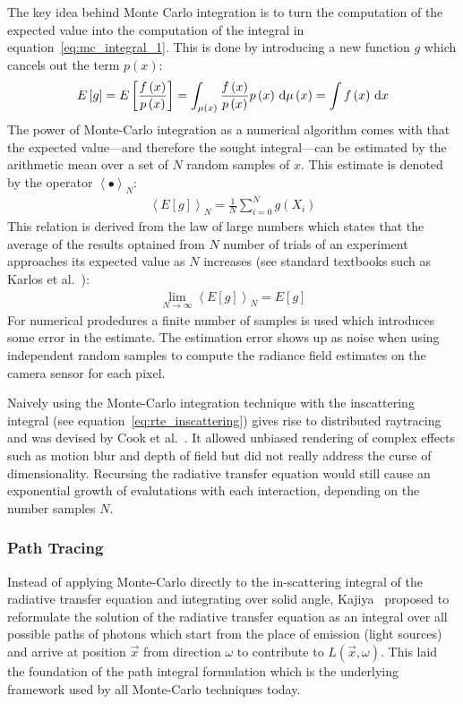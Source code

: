 The key idea behind Monte Carlo integration is to turn the computation of the expected value into the computation of the integral in equation~\ref{eq:mc_integral_1}. This is done by introducing a new function $g$ which cancels out the term $p\left(x\right)$:
\begin{align}
E\left[g\right]
=E\left[\frac{f\left(x\right)}{p\left(x\right)}\right]
= \int_{\mu\left(x\right)} \frac{f\left(x\right)}{p\left(x\right)}p\left(x\right)\,\mathrm{d}\mu\left(x\right)
=\int f\left(x\right)\,\mathrm{d} x
\end{align}
The power of Monte-Carlo integration as a numerical algorithm comes with that the expected value---and therefore the sought integral---can be estimated by the arithmetic mean over a set of $N$ random samples of $x$. This estimate is denoted by the operator $\left<\bullet\right>_N$:
\begin{align}
\left<E[g]\right>_N = 
\frac{1}{N}\sum_{i=0}^{N}
g\left(X_i\right)
\end{align}
This relation is derived from the law of large numbers which states that the average of the results optained from $N$ number of trials of an experiment approaches its expected value as $N$ increases (see standard textbooks such as Karlos et al.~\cite{Kalos86}):
\begin{align}
\lim_{N\rightarrow\infty} \left<E[g]\right>_N = E[g]
\end{align}
For numerical prodedures a finite number of samples is used which introduces some error in the estimate. The estimation error shows up as noise when using independent random samples to compute the radiance field estimates on the camera sensor for each pixel.

Naively using the Monte-Carlo integration technique with the inscattering integral (see equation~\ref{eq:rte_inscattering}) gives rise to distributed raytracing and was devised by Cook et al.~\cite{Cook84}. It allowed unbiased rendering of complex effects such as motion blur and depth of field but did not really address the curse of dimensionality. Recursing the radiative transfer equation would still cause an exponential growth of evalutations with each interaction, depending on the number samples $N$.


\subsubsection*{Path Tracing}

Instead of applying Monte-Carlo directly to the in-scattering integral of the radiative transfer equation and integrating over solid angle, Kajiya~\cite{Kajiya86} proposed to reformulate the solution of the radiative transfer equation as an integral over all possible paths of photons which start from the place of emission (light sources) and arrive at position $\vec{x}$ from direction $\omega$ to contribute to $L(\vec{x}, \omega)$. This laid the foundation of the path integral formulation which is the underlying framework used by all Monte-Carlo techniques today.

